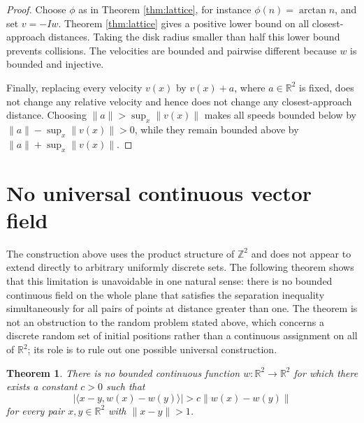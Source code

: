 \documentclass[11pt]{article}
\newtheorem{theorem}{Theorem}[section]
\theoremstyle{remark}
\begin{document}
\begin{proof}
Choose $\phi$ as in Theorem \ref{thm:lattice}, for instance $\phi(n)=\arctan n$, and set $v=-I w$. Theorem \ref{thm:lattice} gives a positive lower bound on all closest-approach distances. Taking the disk radius smaller than half this lower bound prevents collisions. The velocities are bounded and pairwise different because $w$ is bounded and injective.

Finally, replacing every velocity $v(x)$ by $v(x)+a$, where $a\in\mathbb R^2$ is fixed, does not change any relative velocity and hence does not change any closest-approach distance. Choosing $\|a\|>\sup_x\|v(x)\|$ makes all speeds bounded below by $\|a\|-\sup_x\|v(x)\|>0$, while they remain bounded above by $\|a\|+\sup_x\|v(x)\|$.
\end{proof}

\section{No universal continuous vector field}

The construction above uses the product structure of $\mathbb Z^2$ and does not appear to extend directly to arbitrary uniformly discrete sets. The following theorem shows that this limitation is unavoidable in one natural sense: there is no bounded continuous field on the whole plane that satisfies the separation inequality simultaneously for all pairs of points at distance greater than one. The theorem is not an obstruction to the random problem stated above, which concerns a discrete random set of initial positions rather than a continuous assignment on all of $\mathbb R^2$; its role is to rule out one possible universal construction.

\begin{theorem}\label{thm:no-universal}
There is no bounded continuous function $w:\mathbb R^2\to\mathbb R^2$ for which there exists a constant $c>0$ such that
\begin{equation}\label{eq:universal-abs}
\bigl|\langle x-y,w(x)-w(y)\rangle\bigr|>c\|w(x)-w(y)\|
\end{equation}
for every pair $x,y\in\mathbb R^2$ with $\|x-y\|>1$.
\end{theorem}
\end{document}
